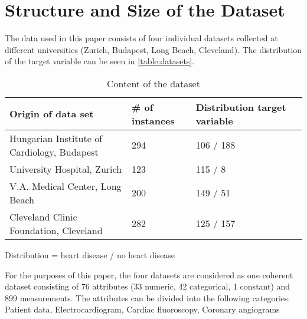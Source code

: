 \section{Structure and Size of the Dataset} \label{sec:dataUnderstanding}


The data used in this paper consists of four individual datasets collected at different universities (Zurich, Budapest, Long Beach, Cleveland). The distribution of the target variable can be seen in \vref{table:datasets}.
\begin{table}[h]

    \begin{footnotesize}
        \begin{tabular}{|l|l|l|l|}
            \hline
            \textbf{Origin of data set}              & \textbf{\# of instances} & \textbf{Distribution target variable} \\ \hline
            Hungarian Institute of Cardiology, Budapest & 294                      & 106 / 188                             \\ \hline
            University Hospital, Zurich                 & 123                      & 115 / 8                               \\ \hline
            V.A. Medical Center, Long Beach             & 200                      & 149 / 51                              \\ \hline
            Cleveland Clinic Foundation, Cleveland      & 282                      & 125 / 157                             \\ \hline
        \end{tabular}
    \end{footnotesize}
    \begin{center}
        \centering
        Distribution = heart disease / no heart disease
    \end{center}
    \caption{Content of the dataset}
    \label{table:datasets}
\end{table}



For the purposes of this paper, the four datasets are considered as one coherent dataset consisting of 76 attributes (33 numeric, 42 categorical, 1 constant) and 899 measurements.
The attributes can be divided into the following categories: Patient data, Electrocardiogram, Cardiac fluoroscopy, Coronary angiograms

